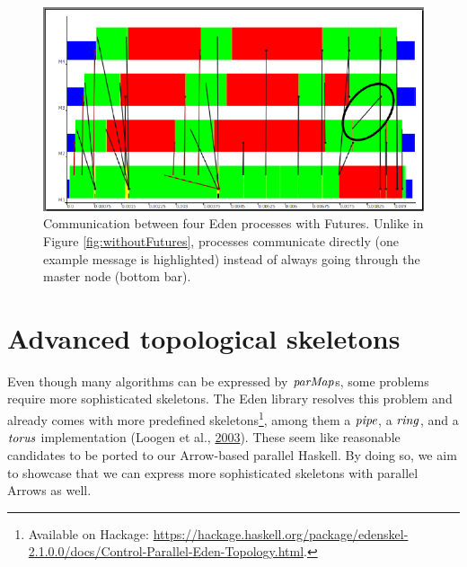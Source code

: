 \documentclass[paper=A4,twoside=true,openright,parskip=full,chapterprefix=true,headings=normal,bibliography=totoc,listof=totoc,titlepage=on,captions=tableabove,draft=false,british]{scrreprt}%
\begin{document}
\begin{figure}
\centering
\includegraphics{src/img/withFutures.pdf}
\caption[Communication between four Eden processes with Futures.]{Communication between four Eden processes with Futures. Unlike in
Figure \ref{fig:withoutFutures}, processes communicate directly (one
example message is highlighted) instead of always going through the
master node (bottom bar).\label{fig:withFutures}}
\end{figure}

\newpage

\hypertarget{advanced-topological-skeletons}{%
\section{Advanced topological
skeletons}\label{advanced-topological-skeletons}}

\label{sec:topology-skeletons}

Even though many algorithms can be expressed by \ensuremath{\Varid{parMap}}s, some problems
require more sophisticated skeletons. The Eden library resolves this
problem and already comes with more predefined skeletons\footnote{Available
  on Hackage:
  \url{https://hackage.haskell.org/package/edenskel-2.1.0.0/docs/Control-Parallel-Eden-Topology.html}.},
among them a \ensuremath{\Varid{pipe}}, a \ensuremath{\Varid{ring}}, and a \ensuremath{\Varid{torus}} implementation (Loogen et
al., \protect\hyperlink{ref-Eden:SkeletonBookChapter02}{2003}). These
seem like reasonable candidates to be ported to our Arrow-based parallel
Haskell. By doing so, we aim to showcase that we can express more
sophisticated skeletons with parallel Arrows as well.
\end{document}
